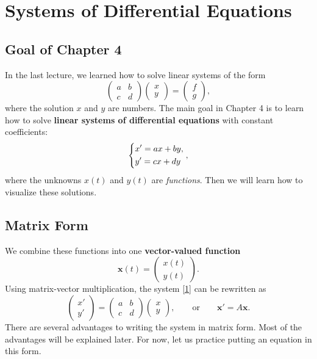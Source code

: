 \documentclass[11pt,letterpaper]{article}
\begin{document}
\section{Systems of Differential Equations}

\subsection{Goal of Chapter 4}
In the last lecture, we learned how to solve linear systems of the form
$$
\begin{pmatrix}
    a & b\\
    c & d
\end{pmatrix} \begin{pmatrix}
    x\\y 
\end{pmatrix} = \begin{pmatrix}
    f\\g
\end{pmatrix},
$$
where the solution $x$ and $y$ are numbers. The main goal in Chapter 4 is to learn how to solve \textbf{linear systems of differential equations} with constant coefficients:
\begin{equation}    
\begin{dcases}
x'=ax+by,\\
y'=cx+dy
\end{dcases},\label{1}
\end{equation}
where the unknowns $x(t)$ and $y(t)$ are \textit{functions}. Then we will learn how to visualize these solutions.

\subsection{Matrix Form}
We combine these functions into one \textbf{vector-valued function}
\[
\mathbf{x}(t)=
\begin{pmatrix}x(t)\\y(t)\end{pmatrix}.
\]
Using matrix-vector multiplication, the system \eqref{1} can be rewritten as 
\[
\begin{pmatrix}x'\\y'\end{pmatrix}
=
\begin{pmatrix}
a&b\\c&d
\end{pmatrix}
\begin{pmatrix}x\\y\end{pmatrix}, \qquad \text{or} \qquad \mathbf{x}'=A\mathbf{x}.
\]
There are several advantages to writing the system in matrix form. Most of the advantages will be explained later. For now, let us practice putting an equation in this form.
\end{document}
